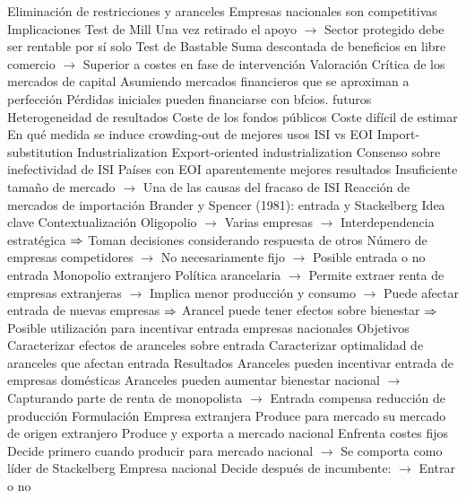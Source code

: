 \documentclass{nuevotema}
\begin{document}
\begin{esquemal}
				\4[] Eliminación de restricciones y aranceles
				\4[] Empresas nacionales son competitivas
			\3 Implicaciones
				\4 Test de Mill
				\4[] Una vez retirado el apoyo
				\4[] $\to$ Sector protegido debe ser rentable por sí solo
				\4 Test de Bastable
				\4[] Suma descontada de beneficios en libre comercio
				\4[] $\to$ Superior a costes en fase de intervención
			\3 Valoración
				\4 Crítica de los mercados de capital
				\4[] Asumiendo mercados financieros que se aproximan a perfección
				\4[] Pérdidas iniciales pueden financiarse con bfcios. futuros
				\4 Heterogeneidad de resultados
				\4 Coste de los fondos públicos
				\4[] Coste difícil de estimar
				\4[] En qué medida se induce crowding-out de mejores usos
				\4 ISI vs EOI
				\4[] Import-substitution Industrialization
				\4[] Export-oriented industrialization
				\4[] Consenso sobre inefectividad de ISI
				\4[] Países con EOI aparentemente mejores resultados
				\4[] Insuficiente tamaño de mercado
				\4[] $\to$ Una de las causas del fracaso de ISI
				\4 Reacción de mercados de importación
		\2 Brander y Spencer (1981): entrada y Stackelberg
			\3 Idea clave
				\4 Contextualización
				\4[] Oligopolio
				\4[] $\to$ Varias empresas
				\4[] $\to$ Interdependencia estratégica
				\4[] $\Rightarrow$ Toman decisiones considerando respuesta de otros
				\4[] Número de empresas competidores
				\4[] $\to$ No necesariamente fijo
				\4[] $\to$ Posible entrada o no entrada
				\4[] Monopolio extranjero
				\4[] Política arancelaria
				\4[] $\to$ Permite extraer renta de empresas extranjeras
				\4[] $\to$ Implica menor producción y consumo
				\4[] $\to$ Puede afectar entrada de nuevas empresas
				\4[] $\Rightarrow$ Arancel puede tener efectos sobre bienestar
				\4[] $\Rightarrow$ Posible utilización para incentivar entrada empresas nacionales
				\4 Objetivos
				\4[] Caracterizar efectos de aranceles sobre entrada
				\4[] Caracterizar optimalidad de aranceles que afectan entrada
				\4 Resultados
				\4[] Aranceles pueden incentivar entrada de empresas domésticas
				\4[] Aranceles pueden aumentar bienestar nacional
				\4[] $\to$ Capturando parte de renta de monopolista
				\4[] $\to$ Entrada compensa reducción de producción
			\3 Formulación
				\4 Empresa extranjera
				\4[] Produce para mercado su mercado de origen extranjero
				\4[] Produce y exporta a mercado nacional
				\4[] Enfrenta costes fijos
				\4[] Decide primero cuando producir para mercado nacional
				\4[] $\to$ Se comporta como líder de Stackelberg
				\4 Empresa nacional
				\4[] Decide después de incumbente:
				\4[] $\to$ Entrar o no

\end{esquemal}
\end{document}
